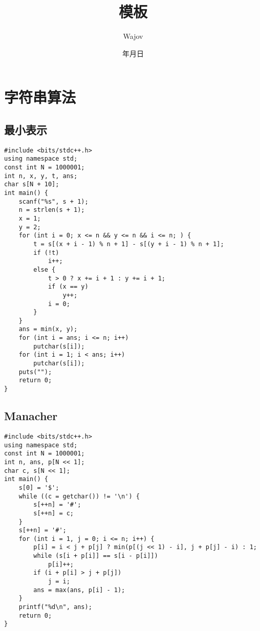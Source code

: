 \documentclass[a4paper]{article}
\begin{document}
\title{模板}
\author{Wajov}
\date{\number\year 年\number\month 月\number\day 日}
\renewcommand{\contentsname}{目录}
\maketitle
{}
\tableofcontents
\newpage
{}
\newfontfamily{}
\section{字符串算法}
\subsection{最小表示}
\begin{lstlisting}
#include <bits/stdc++.h>
using namespace std;
const int N = 1000001;
int n, x, y, t, ans;
char s[N + 10];
int main() {
    scanf("%s", s + 1);
    n = strlen(s + 1);
    x = 1;
    y = 2;
    for (int i = 0; x <= n && y <= n && i <= n; ) {
        t = s[(x + i - 1) % n + 1] - s[(y + i - 1) % n + 1];
        if (!t)
            i++;
        else {
            t > 0 ? x += i + 1 : y += i + 1;
            if (x == y)
                y++;
            i = 0;
        }
    }
    ans = min(x, y);
    for (int i = ans; i <= n; i++)
        putchar(s[i]);
    for (int i = 1; i < ans; i++)
        putchar(s[i]);
    puts("");
    return 0;
}
\end{lstlisting}
\subsection{Manacher}
\begin{lstlisting}
#include <bits/stdc++.h>
using namespace std;
const int N = 1000001;
int n, ans, p[N << 1];
char c, s[N << 1];
int main() {
    s[0] = '$';
    while ((c = getchar()) != '\n') {
        s[++n] = '#';
        s[++n] = c;
    }
    s[++n] = '#';
    for (int i = 1, j = 0; i <= n; i++) {
        p[i] = i < j + p[j] ? min(p[(j << 1) - i], j + p[j] - i) : 1;
        while (s[i + p[i]] == s[i - p[i]])
            p[i]++;
        if (i + p[i] > j + p[j])
            j = i;
        ans = max(ans, p[i] - 1);
    }
    printf("%d\n", ans);
    return 0;
}
\end{lstlisting}
\end{document}
